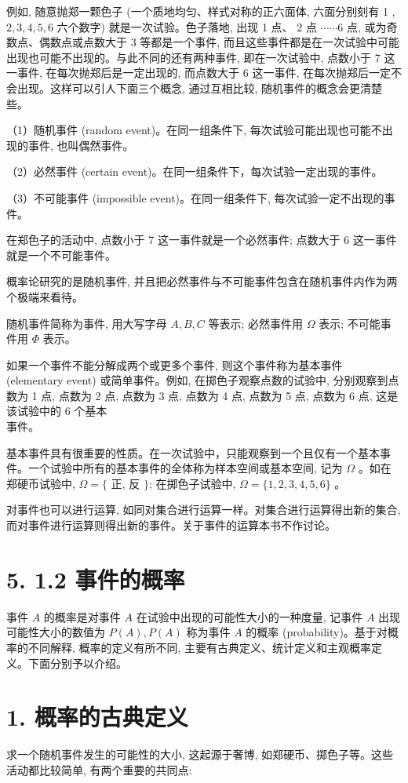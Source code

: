 \documentclass[10pt]{article}
\begin{document}
\begin{CJK*}{UTF8}{bsmi}
例如, 随意抛郑一颗色子 (一个质地均匀、样式对称的正六面体, 六面分别刻有 1 , $2,3,4,5,6$ 六个数字) 就是一次试验。色子落地, 出现 1 点、 2 点 $\cdots \cdots 6$ 点, 或为奇数点、偶数点或点数大于 3 等都是一个事件, 而且这些事件都是在一次试验中可能出现也可能不出现的。与此不同的还有两种事件, 即在一次试验中, 点数小于 7 这一事件, 在每次抛郑后是一定出现的, 而点数大于 6 这一事件, 在每次抛郑后一定不会出现。这样可以引人下面三个概念, 通过互相比较, 随机事件的概念会更清楚些。

（1）随机事件 (random event)。在同一组条件下, 每次试验可能出现也可能不出现的事件, 也叫偶然事件。

（2）必然事件 (certain event)。在同一组条件下，每次试验一定出现的事件。

（3）不可能事件 (impossible event)。在同一组条件下, 每次试验一定不出现的事件。

在郑色子的活动中, 点数小于 7 这一事件就是一个必然事件; 点数大于 6 这一事件就是一个不可能事件。

概率论研究的是随机事件, 并且把必然事件与不可能事件包含在随机事件内作为两个极端来看待。

随机事件简称为事件, 用大写字母 $A, B, C$ 等表示; 必然事件用 $\Omega$ 表示; 不可能事件用 $\Phi$ 表示。

如果一个事件不能分解成两个或更多个事件, 则这个事件称为基本事件 (elementary event) 或简单事件。例如, 在掷色子观察点数的试验中, 分别观察到点数为 1 点, 点数为 2 点, 点数为 3 点, 点数为 4 点, 点数为 5 点, 点数为 6 点, 这是该试验中的 6 个基本\\
事件。

基本事件具有很重要的性质。在一次试验中，只能观察到一个且仅有一个基本事件。一个试验中所有的基本事件的全体称为样本空间或基本空间, 记为 $\Omega$ 。如在郑硬币试验中, $\Omega=\{$ 正, 反 $\}$; 在掷色子试验中, $\Omega=\{1,2,3,4,5,6\}$ 。

对事件也可以进行运算, 如同对集合进行运算一样。对集合进行运算得出新的集合,而对事件进行运算则得出新的事件。关于事件的运算本书不作讨论。

\section*{5. 1.2 事件的概率}
事件 $A$ 的概率是对事件 $A$ 在试验中出现的可能性大小的一种度量, 记事件 $A$ 出现可能性大小的数值为 $P(A), P(A)$ 称为事件 $A$ 的概率 (probability)。基于对概率的不同解释, 概率的定义有所不同, 主要有古典定义、统计定义和主观概率定义。下面分别予以介绍。

\section*{1. 概率的古典定义}
求一个随机事件发生的可能性的大小, 这起源于奢博, 如郑硬币、掷色子等。这些活动都比较简单, 有两个重要的共同点:


\end{CJK*}
\end{document}
